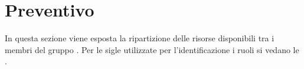 \section{Preventivo}
In questa sezione viene esposta la ripartizione delle risorse disponibili tra i membri del gruppo \Gruppo{}. Per le sigle utilizzate per l'identificazione i ruoli si vedano le \NdPv{}.




